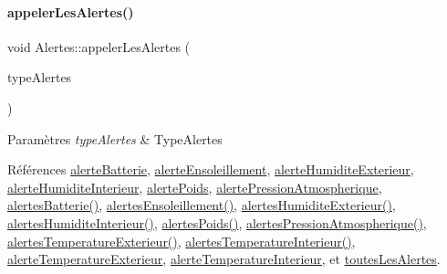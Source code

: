 \mbox{\label{class_alertes_ad04a02dcc6e6f14da0784c7054888b05}} 
\paragraph{\texorpdfstring{appeler\+Les\+Alertes()}{appelerLesAlertes()}}
{\footnotesize\ttfamily void Alertes\+::appeler\+Les\+Alertes (\begin{DoxyParamCaption}\item[{\hyperlink{parametres_8h_a83a725fd153179a2bd97afcc8307737b}{Type\+Alertes}}]{type\+Alertes }\end{DoxyParamCaption})}


\begin{DoxyParams}{Paramètres}
{\em type\+Alertes} & Type\+Alertes \\
\hline
\end{DoxyParams}


Références \hyperlink{parametres_8h_a83a725fd153179a2bd97afcc8307737ba11c71364df2afd149875ebfe0238ef7e}{alerte\+Batterie}, \hyperlink{parametres_8h_a83a725fd153179a2bd97afcc8307737ba256a82c8886c1902dc7a078868434f83}{alerte\+Ensoleillement}, \hyperlink{parametres_8h_a83a725fd153179a2bd97afcc8307737bacda66fabe33c8c197f8ff098a952fca3}{alerte\+Humidite\+Exterieur}, \hyperlink{parametres_8h_a83a725fd153179a2bd97afcc8307737bac0e80b2d9b7f04033abc44ebcf61883a}{alerte\+Humidite\+Interieur}, \hyperlink{parametres_8h_a83a725fd153179a2bd97afcc8307737ba130a82230092934eb515b95603d12956}{alerte\+Poids}, \hyperlink{parametres_8h_a83a725fd153179a2bd97afcc8307737ba3b3b9fe16ae965531aca47449d865ce1}{alerte\+Pression\+Atmospherique}, \hyperlink{class_alertes_ad708a4b800d56c1439b65d12a3c6b027}{alertes\+Batterie()}, \hyperlink{class_alertes_ae7ad960c530a6a7e82df3ed55d159a68}{alertes\+Ensoleillement()}, \hyperlink{class_alertes_a8606946eaa04dfd29bb7951b2b850a04}{alertes\+Humidite\+Exterieur()}, \hyperlink{class_alertes_a7558cb097dc392547ceb12ab4d6cbd4c}{alertes\+Humidite\+Interieur()}, \hyperlink{class_alertes_ac4b8925cc6c262cf7254b1576ba07d33}{alertes\+Poids()}, \hyperlink{class_alertes_ab8a33e82cdd4d4e0560c9ba6e10ca8d5}{alertes\+Pression\+Atmospherique()}, \hyperlink{class_alertes_a91fb2665fa8b6c32c74bfe4d1b89a2d8}{alertes\+Temperature\+Exterieur()}, \hyperlink{class_alertes_a8bc56cf9eb525624b2c1f5b20f86724b}{alertes\+Temperature\+Interieur()}, \hyperlink{parametres_8h_a83a725fd153179a2bd97afcc8307737ba300b33d38ff264e971908d263fbfd1bb}{alerte\+Temperature\+Exterieur}, \hyperlink{parametres_8h_a83a725fd153179a2bd97afcc8307737ba6d07a737b602e59b2350e913e4763724}{alerte\+Temperature\+Interieur}, et \hyperlink{parametres_8h_a83a725fd153179a2bd97afcc8307737ba673fe6d70f1b196ef95a63009d855e08}{toutes\+Les\+Alertes}.



